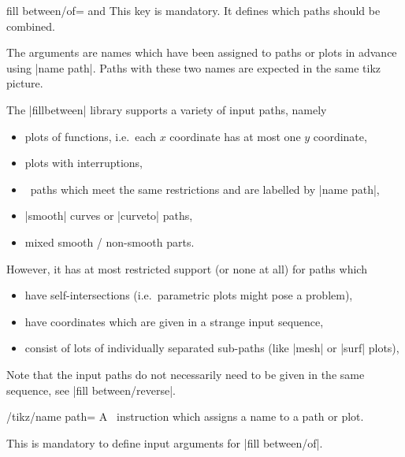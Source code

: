 \begin{tikzkey}{fill between/of= and }
	This key is mandatory. It defines which paths should be combined.

	The arguments are names which have been assigned to paths or plots in advance using |name path|. Paths with these two names are expected in the same tikz picture.

	The |fillbetween| library supports a variety of input paths, namely
	\begin{itemize}
		\item plots of functions, i.e.\ each $x$ coordinate has at most one $y$ coordinate,
		\item plots with interruptions,
		\item \Tikz\ paths which meet the same restrictions and are labelled by |name path|,
		\item |smooth| curves or |curveto| paths,
		\item mixed smooth / non-smooth parts.
	\end{itemize}
	However, it has at most restricted support (or none at all) for paths which
	\begin{itemize}
		\item have self-intersections (i.e.\ parametric plots might pose a problem),
		\item have coordinates which are given in a strange input sequence,
		\item consist of lots of individually separated sub-paths (like |mesh| or |surf| plots),
	\end{itemize}

	Note that the input paths do not necessarily need to be given in the same sequence, see |fill between/reverse|.
\end{tikzkey}

\begin{key}{/tikz/name path=}
	A \Tikz\ instruction which assigns a name to a path or plot.

	This is mandatory to define input arguments for |fill between/of|.
\end{key}

